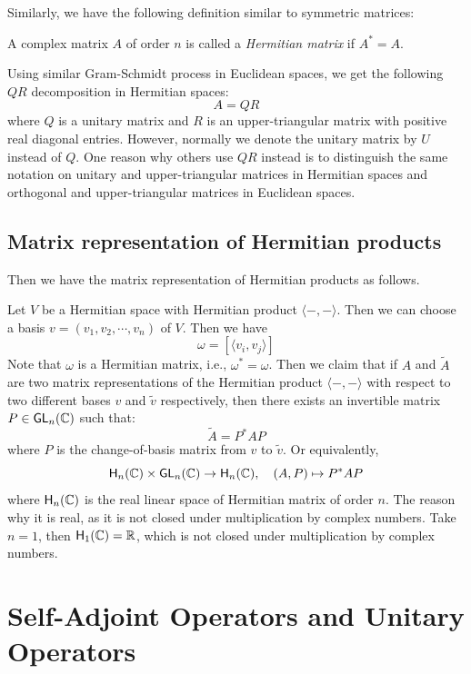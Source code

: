 Similarly, we have the following definition similar to symmetric matrices:
\begin{definition}\label{def:hermitian_matrix}
	A complex matrix $A$ of order $n$ is called a \emph{Hermitian matrix} if $A^* = A$.
\end{definition}

Using similar Gram-Schmidt process in Euclidean spaces, we get the following $QR$ decomposition in Hermitian spaces:
\[
	A = QR
\]
where $Q$ is a unitary matrix and $R$ is an upper-triangular matrix with positive real diagonal entries. However, normally we denote the unitary matrix by $U$ instead of $Q$. One reason why others use $QR$ instead is to distinguish the same notation on unitary and upper-triangular matrices in Hermitian spaces and orthogonal and upper-triangular matrices in Euclidean spaces.

\subsection{Matrix representation of Hermitian products}

Then we have the matrix representation of Hermitian products as follows.

Let $V$ be a Hermitian space with Hermitian product $\langle -, - \rangle$. Then we can choose a basis $v = (v_1, v_2, \cdots, v_n)$ of $V$. Then we have
\[
	\omega = [\langle v_i, v_j \rangle]
\]
Note that $\omega$ is a Hermitian matrix, i.e., $\omega^* = \omega$. Then we claim that if $A$ and $\widetilde{A}$ are two matrix representations of the Hermitian product $\langle -, - \rangle$ with respect to two different bases $v$ and $\widetilde{v}$ respectively, then there exists an invertible matrix $P \in \operatorname{\text{\normalfont\sffamily GL}}_n(\operatorname{\mathbb{C}})$ such that:
\[
	\widetilde{A} = P^* A P
\]
where $P$ is the change-of-basis matrix from $v$ to $\widetilde{v}$. Or equivalently,
\[
	\text{\normalfont\sffamily H}_n(\operatorname{\mathbb{C}}) \times \operatorname{\text{\normalfont\sffamily GL}}_n(\operatorname{\mathbb{C}}) \to \text{\normalfont\sffamily H}_n(\operatorname{\mathbb{C}}), \quad (A, P) \mapsto P^* A P
\]
where $\text{\normalfont\sffamily H}_n(\operatorname{\mathbb{C}})$ is the real linear space of Hermitian matrix of order $n$. The reason why it is real, as it is not closed under multiplication by complex numbers. Take $n = 1$, then $\text{\normalfont\sffamily H}_1(\operatorname{\mathbb{C}}) = \operatorname{\mathbb{R}}$, which is not closed under multiplication by complex numbers.

\section{Self-Adjoint Operators and Unitary Operators}

